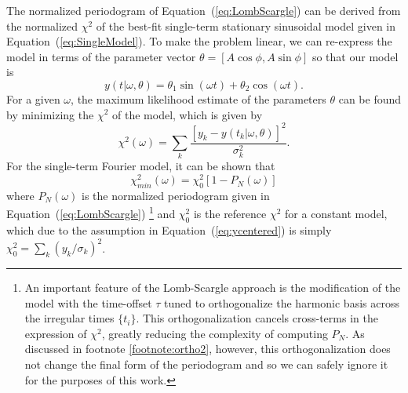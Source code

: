 \documentclass{emulateapj}
\newcommand{\Eq}[1]{Equation~(\ref{eq:#1})}
\newcommand{\eq}[1]{\Eq{#1}}
\newcommand{\eqlabel}[1]{\label{eq:#1}}
\newcommand{\new}[1]{{\color{red} #1}}
\begin{document}
The normalized periodogram of \eq{LombScargle} can be derived from the normalized $\chi^2$ of the best-fit single-term stationary sinusoidal model given in \eq{SingleModel}. To make the problem linear, we can re-express the model in terms of the parameter vector $\theta = [A\cos\phi, A\sin\phi]$ so that our model is
\begin{equation}
  \eqlabel{simplemodel}
  y(t|\omega,\theta) = \theta_1\sin(\omega t) + \theta_2\cos(\omega t).
\end{equation}
For a given $\omega$, the maximum likelihood estimate of the parameters $\theta$ can be found by minimizing the $\chi^2$ of the model, which is given by
\begin{equation}
  \chi^2(\omega) = \sum_k \frac{[y_k - y(t_k|\omega,\theta)]^2}{\sigma_k^2}.
\end{equation}
For the single-term Fourier model, it can be shown \citep[see, e.g.][]{ICVG2014} that
\begin{equation}
  \eqlabel{chi2PN}
  \chi_{min}^2(\omega) = \chi^2_0[1 - P_N(\omega)]
\end{equation}
where $P_N(\omega)$ is the normalized periodogram given in \eq{LombScargle}\new{\footnote{\new{An important feature of the Lomb-Scargle approach is the modification of the model with the time-offset $\tau$ tuned to orthogonalize the harmonic basis across the irregular times $\{t_i\}$. This orthogonalization cancels cross-terms in the expression of $\chi^2$, greatly reducing the complexity of computing $P_N$. As discussed in footnote \ref{footnote:ortho2}, however, this orthogonalization does not change the final form of the periodogram and so we can safely ignore it for the purposes of this work.}}\label{footnote:ortho1}}
and $\chi^2_0$ is the reference $\chi^2$ for a constant model, which due to the assumption in \eq{ycentered} is simply $\chi^2_0 = \sum_k (y_k/\sigma_k)^2$.
\end{document}
